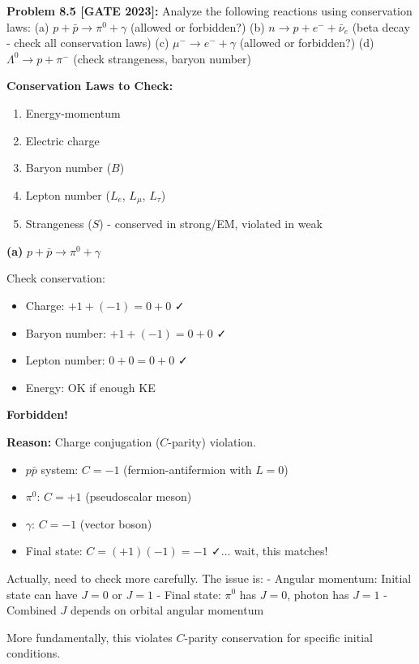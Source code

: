 \documentclass[12pt,a4paper]{article}
\begin{document}
\textbf{Problem 8.5 [GATE 2023]:} Analyze the following reactions using conservation laws:
(a) $p + \bar{p} \to \pi^0 + \gamma$ (allowed or forbidden?)
(b) $n \to p + e^- + \bar{\nu}_e$ (beta decay - check all conservation laws)
(c) $\mu^- \to e^- + \gamma$ (allowed or forbidden?)
(d) $\Lambda^0 \to p + \pi^-$ (check strangeness, baryon number)

\begin{solution}
\textbf{Conservation Laws to Check:}
\begin{enumerate}
    \item Energy-momentum
    \item Electric charge
    \item Baryon number ($B$)
    \item Lepton number ($L_e$, $L_\mu$, $L_\tau$)
    \item Strangeness ($S$) - conserved in strong/EM, violated in weak
\end{enumerate}

\textbf{(a)} $p + \bar{p} \to \pi^0 + \gamma$

Check conservation:
\begin{itemize}
    \item Charge: $+1 + (-1) = 0 + 0$ ✓
    \item Baryon number: $+1 + (-1) = 0 + 0$ ✓
    \item Lepton number: $0 + 0 = 0 + 0$ ✓
    \item Energy: OK if enough KE
\end{itemize}

\textbf{Forbidden!} 

\textbf{Reason:} Charge conjugation ($C$-parity) violation.
\begin{itemize}
    \item $p\bar{p}$ system: $C = -1$ (fermion-antifermion with $L=0$)
    \item $\pi^0$: $C = +1$ (pseudoscalar meson)
    \item $\gamma$: $C = -1$ (vector boson)
    \item Final state: $C = (+1)(-1) = -1$ ✓... wait, this matches!
\end{itemize}

Actually, need to check more carefully. The issue is:
- Angular momentum: Initial state can have $J=0$ or $J=1$
- Final state: $\pi^0$ has $J=0$, photon has $J=1$
- Combined $J$ depends on orbital angular momentum

More fundamentally, this violates $C$-parity conservation for specific initial conditions.


\end{solution}
\end{document}
